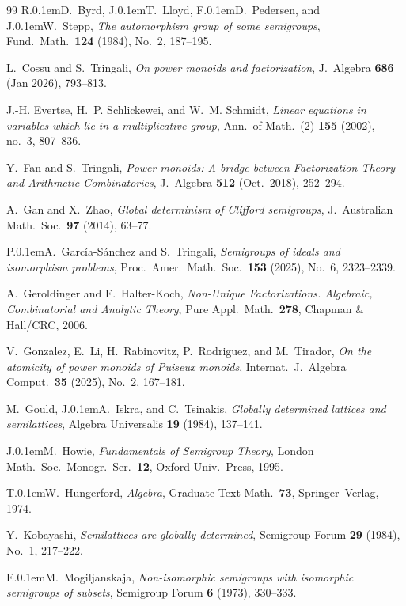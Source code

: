 \documentclass[11pt,reqno]{amsart}
\theoremstyle{definition}
\theoremstyle{remark}
\theoremstyle{theoremdd}
\renewcommand{\,}{\kern 0.1em}
\begin{document}
\begin{thebibliography}{99}
 R.\,D.~Byrd, J.\,T.~Lloyd, F.\,D.~Pedersen, and J.\,W.~Stepp, \textit{The automorphism group of some semigroups}, Fund.\  Math.~\textbf{124} (1984), No.~2, 187--195.

 L.~Cossu and S.~Tringali, \textit{On power monoids and factorization}, J.\ Algebra \textbf{686} (Jan 2026), 793--813.

 J.-H. Evertse, H.~P. Schlickewei, and W.~M. Schmidt,
\textit{Linear equations in variables which lie in a multiplicative group},
Ann.\ of Math.\ (2) \textbf{155} (2002), no.~3, 807--836.

 Y.~Fan and S.~Tringali, \textit{Power monoids: A bridge between Factorization Theory and Arithmetic Combinatorics}, J.~Algebra \textbf{512} (Oct.~2018), 252--294.

 A.~Gan and X.~Zhao, \textit{Global determinism of Clifford semigroups}, J.~Australian Math.~Soc.\ \textbf{97} (2014), 63--77.

  P.\,A.~Garc\'ia-S\'anchez and S.~Tringali, \textit{Semigroups of ideals and isomorphism problems},  Proc.\ Amer.\ Math.\ Soc.\ \textbf{153} (2025), No.\ 6, 2323--2339.

 A.~Geroldinger and F.~Halter-Koch, \textit{Non-Unique Factorizations. Algebraic, Combinatorial and Analytic Theory}, Pure Appl.~Math.~\textbf{278}, Chapman \& Hall/CRC, 2006.

 V.~Gonzalez, E.~Li, H.~Rabinovitz, P.~Rodriguez, and M.~Tirador, \textit{On the atomicity of power monoids of Puiseux monoids}, Internat.\ J.\ Algebra Comput.\ \textbf{35} (2025), No.~2, 167--181. 

M.~Gould, J.\,A.~Iskra, and C.~Tsinakis,
\textit{Globally determined lattices and semilattices},
Algebra Universalis \textbf{19} (1984), 137--141.

 J.\,M.~Howie, \textit{Fundamentals of Semigroup Theory}, London Math.\ Soc.\ Monogr.\ Ser.~\textbf{12}, Oxford Univ.\ Press, 1995.

 T.\,W.\ Hungerford, \textit{Algebra}, Graduate Text Math.\ \textbf{73}, Springer--Verlag, 1974.

 Y.~Kobayashi, \textit{Semilattices are globally determined}, Semigroup Forum \textbf{29} (1984), No.~1, 217--222.

 E.\,M.~Mogiljanskaja, \textit{Non-isomorphic semigroups with isomorphic semigroups of subsets}, Semigroup Forum \textbf{6} (1973), 330--333.


\end{thebibliography}
\end{document}
